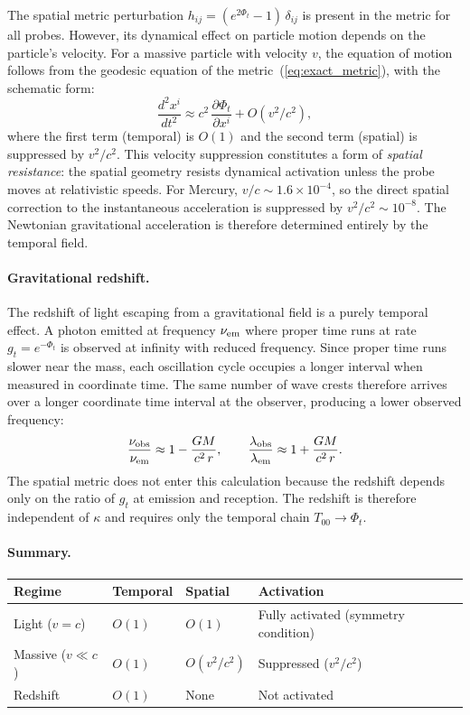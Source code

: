 \documentclass[12pt]{article}
\begin{document}
The spatial metric perturbation $h_{ij} = (e^{2\Phi_t} - 1)\,\delta_{ij}$ is present in the metric for all probes. However, its dynamical effect on particle motion depends on the particle's velocity. For a massive particle with velocity $v$, the equation of motion follows from the geodesic equation of the metric~(\ref{eq:exact_metric}), with the schematic form:
$$
\frac{d^2 x^i}{dt^2} \approx c^2\,\frac{\partial\Phi_t}{\partial x^i} + O(v^2/c^2),
$$
where the first term (temporal) is $O(1)$ and the second term (spatial) is suppressed by $v^2/c^2$. This velocity suppression constitutes a form of \emph{spatial resistance}: the spatial geometry resists dynamical activation unless the probe moves at relativistic speeds. For Mercury, $v/c \sim 1.6 \times 10^{-4}$, so the direct spatial correction to the instantaneous acceleration is suppressed by $v^2/c^2 \sim 10^{-8}$. The Newtonian gravitational acceleration is therefore determined entirely by the temporal field.

\paragraph{Gravitational redshift.}

The redshift of light escaping from a gravitational field is a purely temporal effect. A photon emitted at frequency $\nu_{\rm em}$ where proper time runs at rate $g_t = e^{-\Phi_t}$ is observed at infinity with reduced frequency. Since proper time runs slower near the mass, each oscillation cycle occupies a longer interval when measured in coordinate time. The same number of wave crests therefore arrives over a longer coordinate time interval at the observer, producing a lower observed frequency:
$$
\frac{\nu_{\rm obs}}{\nu_{\rm em}} \approx 1 - \frac{GM}{c^2\,r}, \qquad \frac{\lambda_{\rm obs}}{\lambda_{\rm em}} \approx 1 + \frac{GM}{c^2\,r}.
$$
The spatial metric does not enter this calculation because the redshift depends only on the ratio of $g_t$ at emission and reception. The redshift is therefore independent of $\kappa$ and requires only the temporal chain $T_{00} \to \Phi_t$.

\paragraph{Summary.}

\begin{center}
\small
\begin{tabular}{llll}
\hline
Regime & Temporal & Spatial & Activation \\
\hline
Light ($v = c$) & $O(1)$ & $O(1)$ & Fully activated (symmetry condition) \\
Massive ($v \ll c$) & $O(1)$ & $O(v^2/c^2)$ & Suppressed ($v^2/c^2$) \\
Redshift & $O(1)$ & None & Not activated \\
\hline
\end{tabular}
\end{center}
\end{document}
